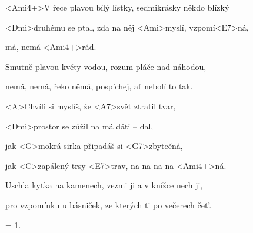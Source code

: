 

\zs
<Ami4+>V řece plavou bílý lístky, sedmikrásky někdo blízký

<Dmi>druhému se ptal, zda na něj <Ami>myslí, vzpomí<E7>ná,

má, nemá <Ami4+>rád.
\ks

\zs
Smutně plavou květy vodou, rozum pláče nad náhodou,

nemá, nemá, řeko němá, pospíchej, ať nebolí to tak.
\ks

\zr
<A>Chvíli si myslíš, že <A7>svět ztratil tvar,

<Dmi>prostor se zúžil na má dáti -- dal,

jak <G>mokrá sirka připadáš si <G7>zbytečná,

jak <C>zapálený trsy <E7>trav, na na na na <Ami4+>ná.
\kr

\zs
Uschla kytka na kamenech, vezmi ji a v knížce nech ji,

pro vzpomínku u básniček, ze kterých ti po večerech čet'.
\ks

\zr
\kr

\zs
= 1.
\ks

\kp
